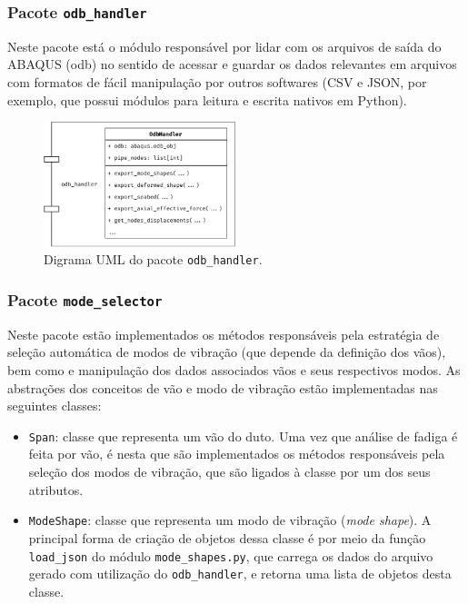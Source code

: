 \subsubsection{Pacote \texttt{odb\_handler}}


Neste pacote está o módulo responsável por lidar com os arquivos de saída do ABAQUS (odb) no sentido de acessar e guardar os dados relevantes em arquivos com formatos de fácil manipulação por outros softwares (CSV e JSON, por exemplo, que possui módulos para leitura e escrita nativos em Python).


\begin{figure}[!ht]
    \centering
    \caption{Digrama UML do pacote \texttt{odb\_handler}.}\label{fig:odb-handler-uml}
    \includegraphics[width=0.5\textwidth]{imagens/odb-handler-uml}
\end{figure}


\subsubsection{Pacote \texttt{mode\_selector}}


Neste pacote estão implementados os métodos responsáveis pela estratégia de seleção automática de modos de vibração (que depende da definição dos vãos), bem como e manipulação dos dados associados vãos e seus respectivos modos. As abstrações dos conceitos de vão e modo de vibração estão implementadas nas seguintes classes:

\begin{itemize}
    \item \texttt{Span}: classe que representa um vão do duto. Uma vez que análise de fadiga é feita por vão, é nesta que são implementados os métodos responsáveis pela seleção dos modos de vibração, que são ligados à classe por um dos seus atributos.

    \item \texttt{ModeShape}: classe que representa um modo de vibração (\textit{mode shape}). A principal forma de criação de objetos dessa classe é por meio da função \texttt{load\_json} do módulo \texttt{mode\_shapes.py}, que carrega os dados do arquivo gerado com utilização do \texttt{odb\_handler}, e retorna uma lista de objetos desta classe.
\end{itemize}

